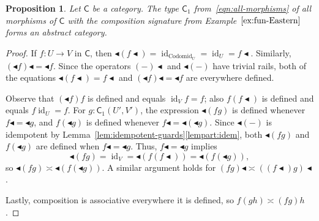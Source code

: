 \documentclass{amsart}
\newcommand{\Cat}[1]{\mathsf{#1}}
\newcommand{\cat}[1]{\Cat{#1}}
\newcommand{\acat}[1]{\mathsf{#1}}
\numberwithin{lstfloat}{section}
\DeclareMathOperator{\id}{id}
\newcommand{\srcfunc}{\mathbin{\blacktriangleleft}}
\newcommand{\tgtfunc}{\mathbin{\blacktriangleleft}}
\newcommand{\src}[1]{#1\srcfunc}
\newcommand{\tgt}[1]{\tgtfunc #1}
\newtheorem{prop}[thm]{Proposition}
\theoremstyle{definition}
\theoremstyle{remark}
\numberwithin{equation}{section}
\begin{document}
\begin{prop}
  \label{prop:morph_laws}
Let $\cat{C}$ be a category. 
The type $\acat{C}_1$ from~\eqref{eqn:all-morphisms} of all
morphisms of $\cat{C}$ with the composition signature 
from Example~$\ref{ex:fun-Eastern}$ forms an abstract category.
\end{prop}
\begin{proof}
  If $f:U \to V$ in $\acat{C}$, then 
  \(
    \tgt{(\src{f})}
      = \id_{\text{Codom} \id_{U}}
      = \id_{U}
      = \src{f}.
  \)
  Similarly, $\src{(\tgt{f})}=\tgt{f}$.    Since the operators $\src{(-)}$ and
  $\tgt{(-)}$ have trivial rails, both of the equations $\tgt{(\src{f})} =
  \src{f}$ and $\src{(\tgt{f})}=\tgt{f}$ are everywhere defined. 
 
  Observe that $(\tgt{f})f$ is defined and equals $\id_{V}f=f$; also
  $f(\src{f})$ is defined and equals $f\id_{U}=f$. For $g:\acat{C}_1(U',V')$,
  the expression $\tgt{(fg)}$ is defined whenever $\src{f}=\tgt{g}$, and
  $f(\tgt{g})$ is defined whenever $\src{f} = \tgt{(\tgt{g})}$. Since
  $\tgt{(-)}$ is idempotent by
  Lemma~\ref{lem:idempotent-guards}\ref{lempart:idem}, both $\tgt{(fg)}$ and
  $f(\tgt{g})$ are defined when $\src{f}=\tgt{g}$. Thus, $\src{f}=\tgt{g}$
  implies  
  \[ 
    \tgt{(fg)} = \id_{V} 
     = \tgt{(f(\src{f}))} = \tgt{(f(\tgt{g}))} ,
  \] 
  so $\tgt{(fg)} \asymp \tgt{(f (\tgt{g}))}$. A similar argument holds for
  $\src{(fg)} \asymp \src{((\src{f})g)}$.
  
  Lastly, composition is associative everywhere it is defined, 
  so $f(gh) \asymp (fg)h$. 
\end{proof}
\end{document}
